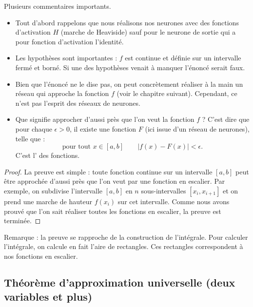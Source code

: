 \documentclass[11pt,class=report,crop=false]{standalone}
\begin{document}
Plusieurs commentaires importants.
\begin{itemize}
  \item Tout d'abord rappelons que nous réalisons nos neurones avec des fonctions d'activation $H$ (marche de Heaviside) sauf pour le neurone de sortie qui a pour fonction d'activation l'identité.
  
  \item Les hypothèses sont importantes : $f$ est continue et définie sur un intervalle fermé et borné. Si une des hypothèses venait à manquer l'énoncé serait faux.
  
  \item Bien que l'énoncé ne le dise pas, on peut concrètement réaliser à la main un réseau qui approche la fonction $f$ (voir le chapitre suivant). Cependant, ce n'est pas l'esprit des réseaux de neurones.
  
  \item Que signifie \og{}approcher d'aussi près que l'on veut la fonction $f$\fg{} ? C'est dire que pour chaque $\epsilon>0$, il existe une fonction $F$ (ici issue d'un réseau de neurones), telle que :
  $$\text{pour tout } x \in [a,b] \qquad | f(x)-F(x) | < \epsilon.$$
  C'est l' des fonctions.
  
\end{itemize}


\begin{proof}  
La preuve est simple : toute fonction continue sur un intervalle $[a,b]$ peut être approchée d'aussi près que l'on veut par une fonction en escalier. Par exemple, on subdivise l'intervalle $[a,b]$ en $n$ sous-intervalles $[x_i,x_{i+1}]$ et on prend une marche de hauteur $f(x_i)$ sur cet intervalle. Comme nous avons prouvé que l'on sait réaliser toutes les fonctions en escalier, la preuve est terminée.



\end{proof}
  
Remarque : la preuve se rapproche de la construction de l'intégrale. Pour calculer l'intégrale, on calcule en fait l'aire de rectangles. Ces rectangles correspondent à nos fonctions en escalier. 


\subsection{Théorème d'approximation universelle (deux variables et plus)}
\end{document}
